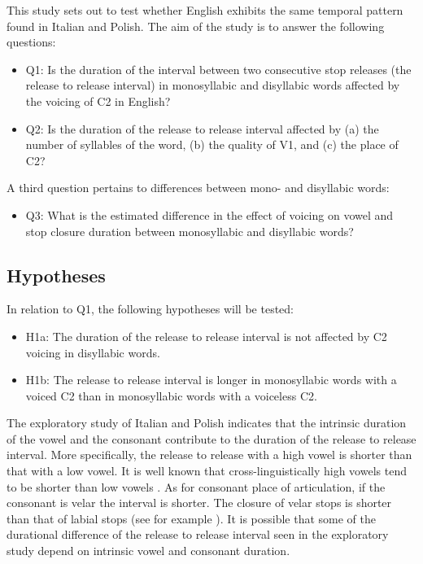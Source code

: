 \documentclass[11pt,]{article}
\providecommand{\tightlist}{%
  \setlength{\itemsep}{0pt}\setlength{\parskip}{0pt}}
\begin{document}
This study sets out to test whether English exhibits the same temporal
pattern found in Italian and Polish. The aim of the study is to answer
the following questions:

\begin{itemize}
\tightlist
\item
  Q1: Is the duration of the interval between two consecutive stop
  releases (the release to release interval) in monosyllabic and
  disyllabic words affected by the voicing of C2 in English?
\item
  Q2: Is the duration of the release to release interval affected by (a)
  the number of syllables of the word, (b) the quality of V1, and (c)
  the place of C2?
\end{itemize}

A third question pertains to differences between mono- and disyllabic
words:

\begin{itemize}
\tightlist
\item
  Q3: What is the estimated difference in the effect of voicing on vowel
  and stop closure duration between monosyllabic and disyllabic words?
\end{itemize}

\hypertarget{hypotheses}{%
\subsection{Hypotheses}\label{hypotheses}}

In relation to Q1, the following hypotheses will be tested:

\begin{itemize}
\tightlist
\item
  H1a: The duration of the release to release interval is not affected
  by C2 voicing in disyllabic words.
\item
  H1b: The release to release interval is longer in monosyllabic words
  with a voiced C2 than in monosyllabic words with a voiceless C2.
\end{itemize}

The exploratory study of Italian and Polish indicates that the intrinsic
duration of the vowel and the consonant contribute to the duration of
the release to release interval. More specifically, the release to
release with a high vowel is shorter than that with a low vowel. It is
well known that cross-linguistically high vowels tend to be shorter than
low vowels
\citep{hertrich1997, esposito2002, mortensen2013, toivonen2015, kawahara2017}.
As for consonant place of articulation, if the consonant is velar the
interval is shorter. The closure of velar stops is shorter than that of
labial stops (see for example \citealt{sharf1962}). It is possible that
some of the durational difference of the release to release interval
seen in the exploratory study depend on intrinsic vowel and consonant
duration.
\end{document}
